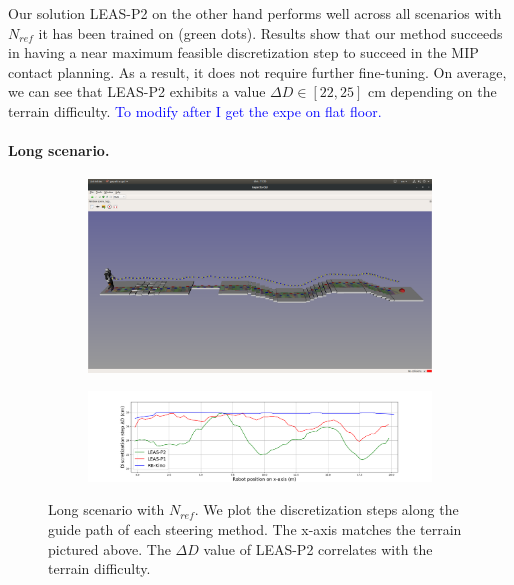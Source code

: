 Our solution LEAS-P2 on the other hand performs well across all scenarios with $N_{ref}$ it has been trained on (green dots).
Results show that our method succeeds in having a near maximum feasible discretization step to succeed in the MIP contact planning. 
As a result, it does not require further fine-tuning.
On average, we can see that LEAS-P2 exhibits a value $\Delta D \in [22, 25]$ cm depending on the terrain difficulty. \textcolor{blue}{To modify after I get the expe on flat floor.}


\paragraph{Long scenario.}
\begin{figure}[ht]
    \centering
    \captionsetup[subfigure]{justification=centering}
    \begin{subfigure}[t]{0.9\linewidth}
        \includegraphics[trim={1cm 12cm 1cm 15cm}, clip,width=\textwidth]{Figures/Chapter_MIP_SL1M/1x11_guide_all_surf_steps.png}
    \end{subfigure}
    \begin{subfigure}[t]{0.9\linewidth}
        \includegraphics[trim={4cm 0cm 3.5cm 1.65cm}, clip,width=\textwidth]{Figures/Chapter_MIP_SL1M/res_mip/Long_discr_x_axis.png}
    \end{subfigure}
    \caption{Long scenario with $N_{ref}$. We plot the discretization steps along the guide path of each steering method. The x-axis matches the terrain pictured above. The $\Delta D$ value of LEAS-P2 correlates with the terrain difficulty.}
    \label{fig:mip:long_range}
\end{figure}

